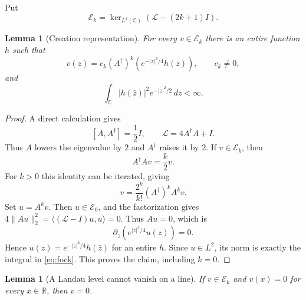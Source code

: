 \documentclass[11pt]{article}
\newtheorem{lemma}[theorem]{Lemma}
\newcommand{\C}{\mathbb C}
\newcommand{\R}{\mathbb R}
\newcommand{\cE}{\mathcal E}
\newcommand{\dd}{\,d}
\newcommand{\pa}{\partial}
\newcommand{\ad}{A^{\dagger}}
\begin{document}
Put
\[
 \cE_k=\ker_{L^2(\C)}(\mathcal L-(2k+1)I).
\]

\begin{lemma}[Creation representation]\label{lem:creation}
For every $v\in\cE_k$ there is an entire function $h$ such that
\begin{equation}\label{eq:creation}
 v(z)=c_k(\ad)^k\left(e^{-|z|^2/4}h(\bar z)\right),
 \qquad c_k\ne0,
\end{equation}
and
\begin{equation}\label{eq:fock}
 \int_{\C}|h(\bar z)|^2e^{-|z|^2/2}\dd z<\infty.
\end{equation}
\end{lemma}

\begin{proof}
A direct calculation gives
\[
 [A,\ad]=\frac12I,
 \qquad
 \mathcal L=4\ad A+I.
\]
Thus $A$ lowers the eigenvalue by $2$ and $\ad$ raises it by $2$.
If $v\in\cE_k$, then
\[
 \ad Av=\frac{k}{2}v.
\]
For $k>0$ this identity can be iterated, giving
\[
 v=\frac{2^k}{k!}(\ad)^kA^kv.
\]
Set $u=A^kv$.  Then $u\in\cE_0$, and the factorization gives
$4\|Au\|_2^2=\langle(\mathcal L-I)u,u\rangle=0$.  Thus $Au=0$, which is
\[
 \pa_z\left(e^{|z|^2/4}u(z)\right)=0.
\]
Hence $u(z)=e^{-|z|^2/4}h(\bar z)$ for an entire $h$.  Since $u\in L^2$,
its norm is exactly the integral in \eqref{eq:fock}.  This proves the
claim, including $k=0$.
\end{proof}

\begin{lemma}[A Landau level cannot vanish on a line]\label{lem:axis}
If $v\in\cE_k$ and $v(x)=0$ for every $x\in\R$, then $v=0$.
\end{lemma}
\end{document}
